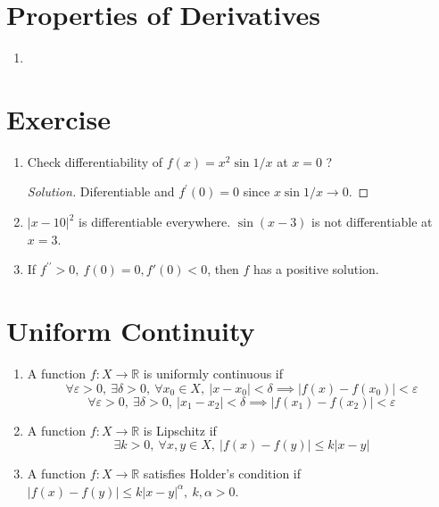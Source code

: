 \section{Properties of Derivatives}
\begin{enumerate}
	\item
\end{enumerate}

\section*{Exercise}
\begin{enumerate}
	\item Check differentiability of $f(x) = x^2 \sin 1/x$ at $x = 0$ ?
	\begin{proof}[Solution]
		Diferentiable and $f^\prime(0) = 0$ since $x\sin 1/x \to 0$.
	\end{proof}
	\item 
	\subitem $|x-10|^2$ is differentiable everywhere.
	\subitem $\sin (x-3)$ is not differentiable at $x = 3$.
	\item If $f^{\prime\prime} > 0,\ f(0) = 0, f'(0) < 0$, then $f$ has a positive solution.
\end{enumerate}

\section{Uniform Continuity}
\begin{enumerate}
	\item A function $f : X \to \mathbb{R}$ is uniformly continuous if 
		$$ \forall \varepsilon > 0,\ \exists \delta > 0,\ \forall x_0 \in X,\ |x-x_0|<\delta \implies |f(x)-f(x_0)| < \varepsilon $$
		$$ \forall \varepsilon > 0,\ \exists \delta > 0,\ |x_1-x_2| < \delta \implies |f(x_1)-f(x_2)| < \varepsilon $$
	\item A function $f : X \to \mathbb{R}$ is Lipschitz if 
		$$ \exists k > 0,\ \forall x,y \in X,\ |f(x)-f(y)| \le k|x-y|$$
	\item A function $f : X \to \mathbb{R}$ satisfies Holder's condition if $|f(x)-f(y)| \le k|x-y|^\alpha,\ k,\alpha > 0$.
\end{enumerate}

